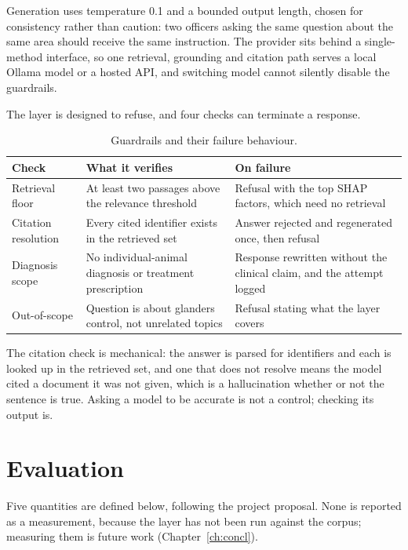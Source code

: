 \documentclass[10pt,openany]{report}
\begin{document}
Generation uses temperature 0.1 and a bounded output length, chosen for consistency rather than
caution: two officers asking the same question about the same area should receive the same
instruction. The provider sits behind a single-method interface, so one retrieval, grounding and
citation path serves a local Ollama model or a hosted API, and switching model cannot silently
disable the guardrails.

The layer is designed to refuse, and four checks can terminate a response.

\begin{table}[htbp]
\centering
\caption{Guardrails and their failure behaviour.}
\label{tab:guardrails}
\small
\begin{tabular}{@{}>{\raggedright\arraybackslash}p{3.0cm}>{\raggedright\arraybackslash}p{5.2cm}>{\raggedright\arraybackslash}p{5.4cm}@{}}
\toprule
\textbf{Check} & \textbf{What it verifies} & \textbf{On failure} \\
\midrule
Retrieval floor & At least two passages above the relevance threshold & Refusal with the top SHAP factors, which need no retrieval \\
Citation resolution & Every cited identifier exists in the retrieved set & Answer rejected and regenerated once, then refusal \\
Diagnosis scope & No individual-animal diagnosis or treatment prescription & Response rewritten without the clinical claim, and the attempt logged \\
Out-of-scope & Question is about glanders control, not unrelated topics & Refusal stating what the layer covers \\
\bottomrule
\end{tabular}
\end{table}

The citation check is mechanical: the answer is parsed for identifiers and each is looked up in the
retrieved set, and one that does not resolve means the model cited a document it was not given, which
is a hallucination whether or not the sentence is true. Asking a model to be accurate is not a
control; checking its output is.

\section{Evaluation}

Five quantities are defined below, following the project proposal. None is reported as a measurement,
because the layer has not been run against the corpus; measuring them is future work
(Chapter~\ref{ch:concl}).
\end{document}

